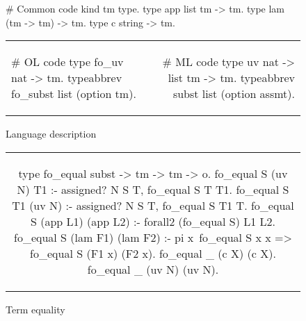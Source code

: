 \begin{figure*}
  \begin{minipage}{.40\textwidth}

    \begin{elpicode}
      # Common code
      kind tm type.
      type app list tm -> tm.
      type lam (tm -> tm) -> tm.
      type c string -> tm.
    \end{elpicode}
    
  \end{minipage}

  \vspace{3pt}

  \begin{tabular}{lr}
    \begin{minipage}{.40\textwidth}

      \begin{elpicode}
        # OL code
        type fo_uv  nat -> tm.
        typeabbrev fo_subst list (option tm).
      \end{elpicode}
    \end{minipage}
    &
    \begin{minipage}{.40\textwidth}
      
      \begin{elpicode}
        # ML code
        type uv  nat -> list tm -> tm.
        typeabbrev subst list (option assmt).
      \end{elpicode}
    \end{minipage}
  \end{tabular}
  
  \caption{Language description}
  \label{code:lang-descr}
\end{figure*}



\begin{figure*}
  \begin{tabular}{c}
    \begin{minipage}{.80\textwidth}
      \begin{elpicode}
        type fo_equal subst -> tm -> tm -> o.
        fo_equal S (uv N) T1 :- assigned? N S T, fo_equal S T T1.
        fo_equal S T1 (uv N) :- assigned? N S T, fo_equal S T1 T.
        fo_equal S (app L1) (app L2) :- forall2 (fo_equal S) L1 L2.
        fo_equal S (lam F1) (lam F2) :- pi x\ fo_equal S x x => fo_equal S (F1 x) (F2 x).
        fo_equal _ (c X) (c X).
        fo_equal _ (uv N) (uv N).
      \end{elpicode}
    \end{minipage}
  \end{tabular}
  \caption{Term equality}
  \label{code:term-equal}
\end{figure*}

